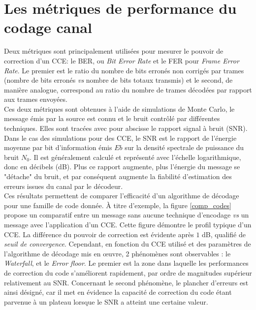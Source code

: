 \documentclass[../main.tex]{subfiles}
\begin{document}
\section{Les métriques de performance du codage canal}
Deux métriques sont principalement utilisées pour mesurer le pouvoir de correction d'un CCE: le BER, ou \textit{Bit Error Rate} et le FER pour \textit{Frame Error Rate}. Le premier est le ratio du nombre de bits erronés non corrigés par trames (nombre de bits erronés \textit{vs} nombre de bits totaux transmis) et le second, de manière analogue, correspond au ratio du nombre de trames décodées par rapport aux trames envoyées. \\
Ces deux métriques sont obtenues à l'aide de simulations de Monte Carlo, le message émis par la source est connu et le bruit contrôlé par différentes techniques. 
Elles sont tracées avec pour abscisse le rapport signal à bruit (SNR). \\
Dans le cas des simulations pour des CCE, le SNR est le rapport de l'énergie moyenne par bit d'information émis $Eb$ sur la densité spectrale de puissance du bruit $N_0$. Il est généralement calculé et représenté avec l'échelle logarithmique, donc en décibels (dB). Plus ce rapport augmente, plus l'énergie du message se "détache" du bruit, et par conséquent augmente la fiabilité d'estimation des erreurs issues du canal par le décodeur. \\
Ces résultats permettent de comparer l'efficacité d'un algorithme de décodage pour une famille de code donnée. À titre d'exemple, la figure \ref{comp_codes} propose un comparatif entre un message sans aucune technique d'encodage \textit{vs} un message avec l'application d'un CCE. Cette figure démontre le profil typique d'un CCE. La différence du pouvoir de correction est évidente après $1$ dB, qualifié de \textit{seuil de convergence}. Cependant, en fonction du CCE utilisé et des paramètres de l'algorithme de décodage mis en œuvre, 2 phénomènes sont observables : le \textit{Waterfall}, et le \textit{Error floor}. Le premier est la zone dans laquelle les performances de correction du code s'améliorent rapidement, par ordre de magnitudes supérieur relativement au SNR. Concernant le second phénomène, le plancher d'erreurs est ainsi désigné, car il met en évidence la capacité de correction du code étant parvenue à un plateau lorsque le SNR a atteint une certaine valeur.
\end{document}
